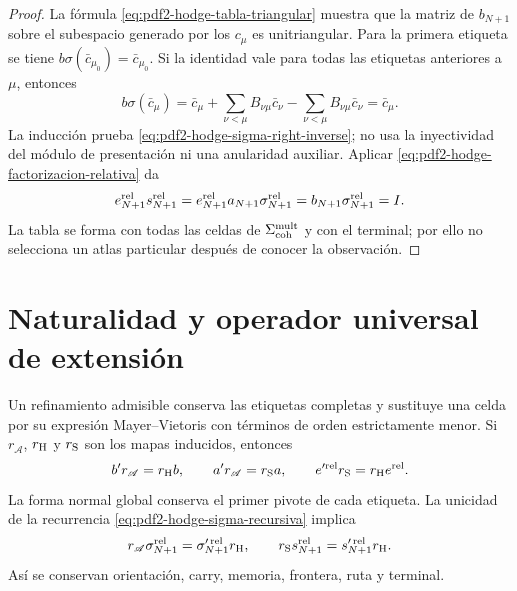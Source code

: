 \begin{proof}
La fórmula \eqref{eq:pdf2-hodge-tabla-triangular} muestra que la
matriz de $b_{N+1}$ sobre el subespacio generado por los $c_\mu$ es
unitriangular. Para la primera etiqueta se tiene
$b\sigma(\bar c_{\mu_0})=\bar c_{\mu_0}$. Si la identidad vale para todas
las etiquetas anteriores a $\mu$, entonces
\[
 b\sigma(\bar c_\mu)
 =\bar c_\mu+\sum_{\nu<\mu}B_{\nu\mu}\bar c_\nu
  -\sum_{\nu<\mu}B_{\nu\mu}\bar c_\nu
 =\bar c_\mu.
\]
La inducción prueba \eqref{eq:pdf2-hodge-sigma-right-inverse}; no usa la
inyectividad del módulo de presentación ni una anularidad auxiliar. Aplicar
\eqref{eq:pdf2-hodge-factorizacion-relativa} da
\[
 e_{N+1}^{\rm rel}s_{N+1}^{\rm rel}
 =e_{N+1}^{\rm rel}a_{N+1}\sigma_{N+1}^{\rm rel}
 =b_{N+1}\sigma_{N+1}^{\rm rel}=I.
\]
La tabla se forma con todas las celdas de
$\Sigma_{\rm coh}^{\rm mult}$ y con el terminal; por ello no selecciona un
atlas particular después de conocer la observación.
\end{proof}

\section{Naturalidad y operador universal de extensión}

Un refinamiento admisible conserva las etiquetas completas y sustituye una
celda por su expresión Mayer--Vietoris con términos de orden estrictamente
menor. Si $r_{\mathscr A}$, $r_{\rm H}$ y $r_{\rm S}$ son los mapas
inducidos, entonces
\begin{equation}\label{eq:pdf2-hodge-entrelazadores-refinamiento}
 b' r_{\mathscr A}=r_{\rm H}b,
 \qquad
 a' r_{\mathscr A}=r_{\rm S}a,
 \qquad
 e'^{\rm rel}r_{\rm S}=r_{\rm H}e^{\rm rel}.
\end{equation}
La forma normal global conserva el primer pivote de cada etiqueta. La
unicidad de la recurrencia \eqref{eq:pdf2-hodge-sigma-recursiva} implica
\begin{equation}\label{eq:pdf2-hodge-naturalidad}
 r_{\mathscr A}\sigma_{N+1}^{\rm rel}
 =\sigma_{N+1}^{\prime\,\rm rel}r_{\rm H},
 \qquad
 r_{\rm S}s_{N+1}^{\rm rel}
 =s_{N+1}^{\prime\,\rm rel}r_{\rm H}.
\end{equation}
Así se conservan orientación, carry, memoria, frontera, ruta y terminal.

